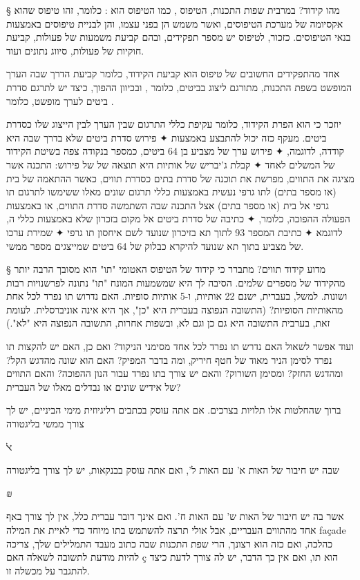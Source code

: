 § מהו קידוד?
במרבית שפות התכנות, הטיפוס , כמו הטיפוס  הוא : כלומר, זהו טיפוס שהוא אקסיומה של מערכת הטיפוסים, ואשר משמש הן בפני עצמו, והן לבניית טיפוסים באמצעות בנאי הטיפוסים. כזכור, לטיפוס יש מספר תפקידים, ובהם קביעת משמעות של פעולות, קביעת חוקיות של פעולות, סיווג נתונים ועוד.
  
אחד מהתפקידים החשובים של טיפוס הוא קביעת הקידוד, כלומר קביעת הדרך שבה הערך המופשט בשפת התכנות, מתורגם ליצוג בביטים, כלומר , ובכיוון ההפוך, כיצד יש לתרגם סדרת ביטים לערך מופשט, כלומר .
  
יוזכר כי  הוא הפרת הקידוד, כלומר עקיפת כללי התרגום שבין הערך לבין הייצוג שלו כסדרת ביטים. מעקף כזה יכול להתבצע באמצעות
✦ פירוש סדרת ביטים שלא בדרך שבה היא קודדה, לדוגמה,
✦ פירוש ערך של מצביע בן 64 ביטים, כמספר בנקודה צפה בשיטת הקידוד של המשלים לאחד
✦ קבלת ג'יבריש של אותיות היא תוצאה של  של פירוש: התכנה אשר מציגה את התווים, מפרשת את תוכנה של סדרת בתים כסדרת תווים, כאשר ההתאמה של בית (או מספר בתים) לתו גרפי נעשית באמצעות כללי תרגום שונים מאלו ששימשו לתרגום תו גרפי אל בית (או מספר בתים) אצל התכנה שבה השתמשה סדרת התווים,
או באמצעות הפעולה ההפוכה, כלומר,
✦ כתיבה של סדרת ביטים אל מקום בזכרון שלא באמצעות כללי ה, לדוגמא
✦ כתיבת המספר 93 לתוך תא בזיכרון שנועד לשם איחסון תו גרפי
✦ שמירת ערכו של מצביע בתוך תא שנועד להיקרא כבלוק של 64 ביטים שמייצגים מספר ממשי.

§ מדוע קידוד תווים?
מתברר כי קידוד של הטיפוס האטומי "תו" הוא מסובך הרבה יותר מהקידוד של מספרים שלמים. הסיבה לך היא שמשמעות המונח "תו" נתונה לפרשנויות רבות ושונות. למשל, בעברית, ישנם 22 אותיות, ו-5 אותיות סופיות. האם נדרוש תו נפרד לכל אחת מהאותיות הסופיות? (התשובה הנפוצה בעברית היא "כן", אך היא אינה אוניברסלית. לעומת זאת, בערבית התשובה היא גם כן וגם לא, ובשפות אחרות, התשובה הנפוצה היא "לא".)

ועוד אפשר לשאול האם נדרש תו נפרד לכל אחד מסימני הניקוד? ואם כן, האם יש להקצות תו נפרד לסימן הניר מאוד של חטף חיריק, ומה בדבר המפיק? האם הוא שונה מהדגש הקל? ומהדגש החזק? ומסימן השורוק? והאם יש צורך בתו נפרד עבור הנון ההפוכה? והאם התווים של אידיש שונים או נבדלים מאלו של העברית?


ברוך שהחלטות אלו תלויות בצרכים. אם אתה עוסק בכתבים רליגיוזית מימי הביניים, יש לך צורך ממשי בליגטורה
\begin{center}
\Huge{ﭏ}
\normalsize{}
\end{center}
שבה יש חיבור של האות א' עם האות ל', ואם אתה עוסק בבנקאות, יש לך צורך בליגטורה
\begin{center}
\Huge{₪}
\normalsize{}
\end{center}
אשר בה יש חיבור של האות ש' עם האות ח'. ואם אינך דובר עברית כלל, אין לך צורך באף אחד מהתווים העבריים, אבל אולי תרצה להשתמש בתו מיוחד כדי לאיית את המילה façade כהלכה, ואם כזה הוא רצונך, הרי שפת התכנות שבה כתוב מעבד התמלילים שלך, צריכה להיות מודעת לתשובה לשאלה האם ç הוא תו, ואם אין כך הדבר, יש לה צורך לדעת כיצד להתגבר על מכשלה זו.
  
